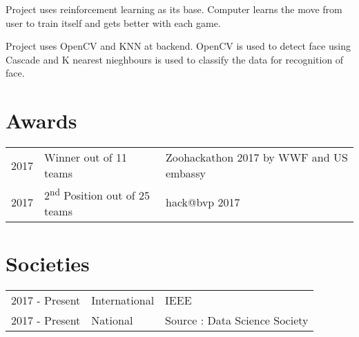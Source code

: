 \documentclass[]{deedy-resume-openfont}
\begin{document}
\begin{minipage}[t]{0.66\textwidth}
Project uses reinforcement learning as its base. Computer learns the move from user to train itself and gets better with each game.
\sectionsep

Project uses OpenCV and KNN at backend. OpenCV is used to detect face using Cascade and K nearest nieghbours is used to classify the data for recognition of face.
\sectionsep


\section{Awards} 
\begin{tabular}{rll}
2017	     & Winner out of 11 teams & Zoohackathon 2017 by WWF and US embassy\\
2017	     & 2\textsuperscript{nd} Position out of 25 teams & hack@bvp 2017 

\end{tabular}
\sectionsep


\section{Societies} 

\begin{tabular}{rll}
2017 - Present 	&   International & IEEE \\
2017 - Present   & National   & Source : Data Science Society

\end{tabular}
\sectionsep

\end{minipage} 
\end{document}
